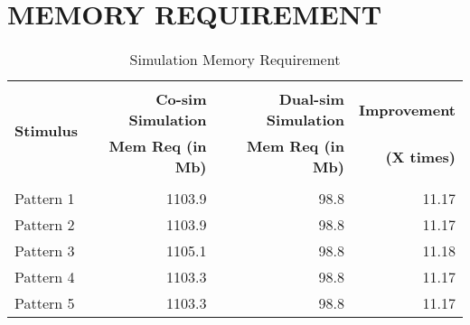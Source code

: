 \section{MEMORY REQUIREMENT}
\begin{table}[h!]
\begin{center}
\caption{Simulation Memory Requirement}
\label{tab:Memory Requirement}
\vspace{0.2cm}
\begin{tabular}{|l|r|r|r|}
\hline
\multirow{3}{*}{\bf Stimulus} & &	&\\ & {\bf Co-sim Simulation} 	& {\bf Dual-sim Simulation} & {\bf Improvement } 	\\ & \bf{Mem Req (in Mb)}  &  {\bf{Mem Req (in Mb)}} &  {\bf(X times) }\\



						&				&				&				\\
\hline
Pattern 1 			&1103.9				&98.8				&11.17 				\\

Pattern 2  				&1103.9				&98.8				&11.17				\\

Pattern 3  		&1105.1				&98.8				&11.18				\\

Pattern 4  			&1103.3			&98.8 				&11.17				\\

Pattern 5  				&1103.3				&98.8				&11.17				\\
\hline


\end{tabular}
\end{center}

\end{table}
